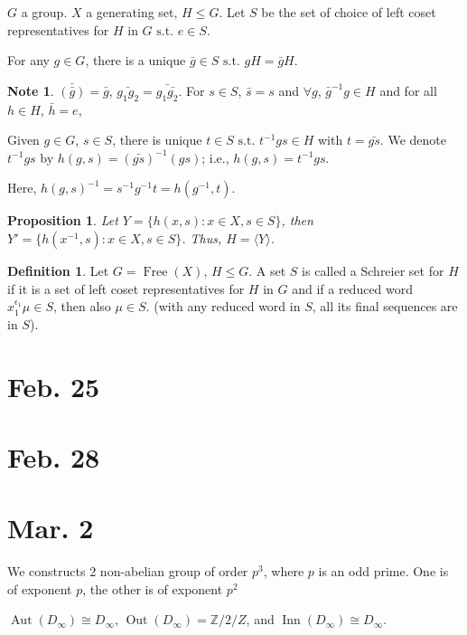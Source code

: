 \documentclass{amsart}
\newtheorem{prop}[thm]{Proposition}
\theoremstyle{definition}
\newtheorem{definition}[thm]{Definition}
\newtheorem{note}[thm]{Note}
\newcommand{\Z}{\mathbb Z}
\newcommand{\st}{\text{ s.t. }}
\DeclareMathOperator{\Aut}{Aut}
\DeclareMathOperator{\Inn}{Inn}
\DeclareMathOperator{\Out}{Out}
\DeclareMathOperator{\Free}{Free}
\begin{document}
$G$ a group. $X$ a generating set, $H\leq G$. Let $S$ be the set of choice of left coset representatives for $H$ in $G\st e\in S$.

For any $g\in G$, there is a unique $\bar g\in S\st gH=\bar gH$.

\begin{note}
	$\bar{(\bar{g})}=\bar g$, $\bar{g_1g_2}=\bar{g_1\bar{g_2}}$. For $s\in S$, $\bar s=s$ and $\forall g$, $\bar g^{-1}g\in H$ and for all $h\in H$, $\bar{h}=e$,

Given $g\in G$, $s\in S$, there is unique $t\in S\st t^{-1}gs\in H$ with $t=\bar{gs}$. We denote $t^{-1}gs$ by $h(g,s)=(\bar{gs})^{-1}(gs)$; i.e., $h(g,s)=t^{-1}gs$.

Here, $h(g,s)^{-1}=s^{-1}g^{-1}t=h(g^{-1},t)$.
\end{note}
\begin{prop}
	Let $Y=\{h(x,s):x\in X,s\in S\}$, then $Y'=\{h(x^{-1},s):x\in X,s\in S\}$. Thus, $H=\langle Y\rangle$.
\end{prop}
\begin{definition}
	Let $G=\Free(X)$, $H\leq G$. A set $S$ is called a Schreier set for $H$ if it is a set of left coset representatives for $H$ in $G$ and if a reduced word $x_1^{\epsilon_1}\mu\in S$, then also $\mu\in S$. (with any reduced word in $S$, all its final sequences are in $S$). 
\end{definition}




\section{Feb. 25}
\section{Feb. 28}
\section{Mar. 2}
We constructs $2$ non-abelian group of order $p^3$, where $p$ is an odd prime. One is of exponent $p$, the other is of exponent $p^2$

$\Aut(D_\infty)\cong D_\infty$, $\Out(D_\infty)=\Z/2/Z$, and $\Inn(D_\infty)\cong D_\infty$.
\end{document}
